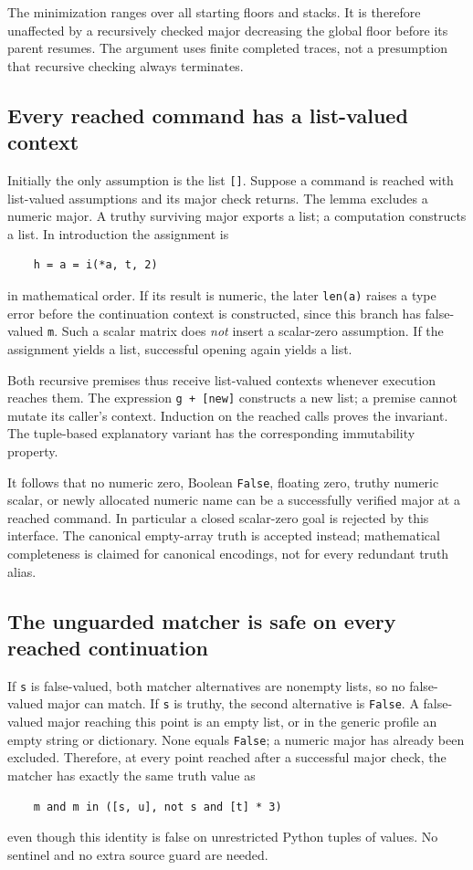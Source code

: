 \documentclass[11pt,letterpaper]{article}
\theoremstyle{definition}\newtheorem{definition}[theorem]{Definition}
\theoremstyle{remark}\newtheorem{remark}[theorem]{Remark}
\begin{document}
The minimization ranges over all starting floors and stacks.  It is
therefore unaffected by a recursively checked major decreasing the
global floor before its parent resumes.  The argument uses finite
completed traces, not a presumption that recursive checking always
terminates.

\subsection{Every reached command has a list-valued context}

Initially the only assumption is the list \texttt{[]}.  Suppose a
command is reached with list-valued assumptions and its major check
returns.  The lemma excludes a numeric major.  A truthy surviving major
exports a list; a computation constructs a list.  In introduction the
assignment is
\begin{verbatim}
    h = a = i(*a, t, 2)
\end{verbatim}
in mathematical order.  If its result is numeric, the later
\texttt{len(a)} raises a type error before the continuation context is
constructed, since this branch has false-valued \texttt{m}.  Such a
scalar matrix does \emph{not} insert a scalar-zero assumption.  If the
assignment yields a list, successful opening again yields a list.

Both recursive premises thus receive list-valued contexts whenever
execution reaches them.  The expression \texttt{g + [new]} constructs a
new list; a premise cannot mutate its caller's context.  Induction on
the reached calls proves the invariant.  The tuple-based explanatory
variant has the corresponding immutability property.

It follows that no numeric zero, Boolean \texttt{False}, floating zero,
truthy numeric scalar, or newly allocated numeric name can be a
successfully verified major at a reached command.  In particular a
closed scalar-zero goal is rejected by this interface.  The canonical
empty-array truth is accepted instead; mathematical completeness is
claimed for canonical encodings, not for every redundant truth alias.

\subsection{The unguarded matcher is safe on every reached continuation}

If \texttt{s} is false-valued, both matcher alternatives are nonempty
lists, so no false-valued major can match.  If \texttt{s} is truthy, the
second alternative is \texttt{False}.  A false-valued major reaching
this point is an empty list, or in the generic profile an empty string
or dictionary.  None equals \texttt{False}; a numeric major has already
been excluded.  Therefore, at every point reached after a successful
major check, the matcher has exactly the same truth value as
\begin{verbatim}
    m and m in ([s, u], not s and [t] * 3)
\end{verbatim}
even though this identity is false on unrestricted Python tuples of
values.  No sentinel and no extra source guard are needed.
\end{document}
